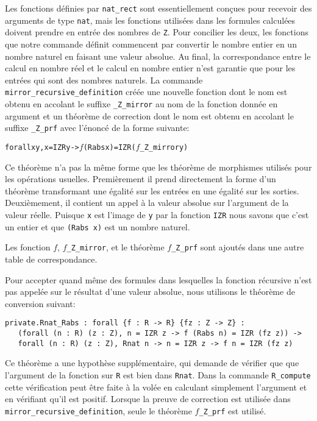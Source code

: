 \documentclass{jflart}
\begin{document}
Les fonctions définies par \texttt{nat\_rect} sont essentiellement
conçues pour recevoir des arguments de type \texttt{nat}, mais les
fonctions utilisées dans les formules calculées doivent prendre en
entrée des nombres de \texttt{Z}.  Pour concilier les deux, les fonctions
que notre commande définit commencent par convertir le nombre entier en
un nombre naturel en faisant une valeur absolue.  Au
final, la correspondance entre le calcul en nombre réel et le
calcul en nombre entier n'est garantie que pour les entrées qui sont
des nombres naturels.
La commande \texttt{mirror\_recursive\_definition} créée une nouvelle
fonction dont le nom est obtenu en accolant le suffixe
\texttt{\_Z\_mirror} au nom de la fonction donnée en argument et un théorème
de correction dont le nom est obtenu en accolant le suffixe
\texttt{\_Z\_prf} avec l'énoncé de la forme suivante:
\begin{alltt}
forall x y, x = IZR y -> \(f\) (Rabs x) = IZR (\(f\)_Z_mirror y)
\end{alltt}

Ce théorème n'a pas la même forme que les théorème de morphismes
utilisés pour les opérations usuelles.  Premièrement il prend
directement la forme d'un théorème transformant une égalité sur les
entrées en une égalité sur les sorties.  Deuxièmement, il contient
un appel à la valeur absolue sur l'argument de la valeur réelle.
Puisque \texttt{x} est l'image de \texttt{y} par la fonction \texttt{IZR} nous
savons que c'est un entier et que \texttt{(Rabs x)} est un nombre
naturel.

Les fonction \texttt{\(f\)}, \texttt{\(f\)\_Z\_mirror}, et le théorème
\texttt{\(f\)\_Z\_prf} sont ajoutés dans une autre table de
correspondance.

Pour accepter quand même des formules dans lesquelles la fonction
récursive n'est pas appelée sur le résultat d'une valeur absolue, nous
utilisons le théorème de conversion suivant:
\begin{verbatim}
private.Rnat_Rabs : forall {f : R -> R} {fz : Z -> Z} :
   (forall (n : R) (z : Z), n = IZR z -> f (Rabs n) = IZR (fz z)) ->
   forall (n : R) (z : Z), Rnat n -> n = IZR z -> f n = IZR (fz z)
\end{verbatim}
Ce théorème a une hypothèse supplémentaire, qui demande de vérifier
que que l'argument de la fonction sur \texttt{R} est bien dans
\texttt{Rnat}.  Dans la commande \texttt{R\_compute} cette vérification peut
être faite à la volée en calculant simplement l'argument et en vérifiant
qu'il est positif.  Lorsque la preuve de correction est utilisée dans
\texttt{mirror\_recursive\_definition}, seule le théorème
{\(f\)\texttt{\_Z\_prf}} est utilisé.
\end{document}
